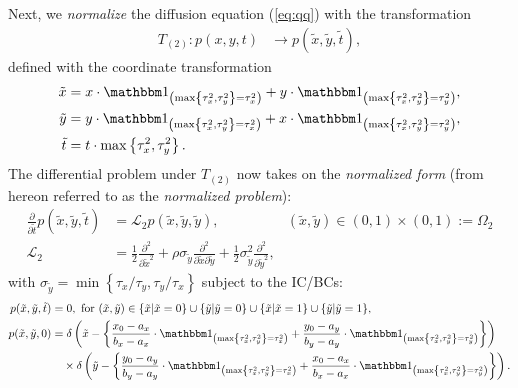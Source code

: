 Next, we \textit{normalize} the diffusion equation (\ref{eq:qq}) with the transformation
\begin{align}
  T_{(2)}: p(x,y,t) &\to p(\tilde{x}, \tilde{y}, \tilde{t}),
\end{align}
defined with the coordinate transformation
\begin{align}
  \tilde{x} &= x\cdot \Indicator{ \max\left\{\tau_x^2, \tau_y^2 \right\} = \tau_x^2} + y\cdot \Indicator{ \max\left\{\tau_x^2, \tau_y^2 \right\} = \tau_y^2}, \\
  \tilde{y} &= y\cdot \Indicator{ \max\left\{\tau_x^2, \tau_y^2 \right\} = \tau_x^2} + x\cdot \Indicator{ \max\left\{\tau_x^2, \tau_y^2 \right\} = \tau_y^2}, \\
  \tilde{t} &= t\cdot \max\left\{\tau_x^2, \tau_y^2 \right\}.
\end{align}
The differential problem under $T_{(2)}$ now takes on the
\textit{normalized form} (from hereon referred to as the
\textit{normalized problem}):
\begin{align}
  \frac{\partial}{\partial \tilde{t}} p(\tilde{x},\tilde{y},\tilde{t}) &= \mathcal{L}_2 p(\tilde{x},\tilde{y},\tilde{y}), & (\tilde{x}, \tilde{y}) \in (0,1) \times (0,1) := \Omega_2 \label{eq:qqq} \\
  \mathcal{L}_2 &= \frac{1}{2} \frac{\partial^2}{\partial \tilde{x}^2} + \rho \sigma_{\tilde{y}} \frac{\partial^2}{\partial \tilde{x} \partial \tilde{y}} + \frac{1}{2} \sigma^2_{\tilde{y}} \frac{\partial^2}{\partial \tilde{y}^2},
\end{align}
with
$\sigma_{\tilde{y}} = \min\left\{ \tau_x/\tau_y, \tau_y/\tau_x
\right\}$ subject to the IC/BCs:
\begin{align}
  p(\tilde{x},\tilde{y},\tilde{t}) &=0,  \mbox{ for }  (\tilde{x},\tilde{y}) \in \{ \tilde{x} | \tilde{x} = 0\} \cup \{ \tilde{y} | \tilde{y} = 0\} \cup \{ \tilde{x} | \tilde{x} = 1\} \cup \{ \tilde{y} | \tilde{y} = 1\}, \nonumber \\
  p(\tilde{x},\tilde{y},0) &= \delta\left( \tilde{x} - \left\{\frac{x_0-a_x}{b_x - a_x}\cdot \Indicator{ \max\left\{\tau_x^2, \tau_y^2 \right\} = \tau_x^2} + \frac{y_0-a_y}{b_y - a_y}\cdot \Indicator{ \max\left\{\tau_x^2, \tau_y^2 \right\} = \tau_y^2} \right\} \right) \\
  &\quad \times \delta\left( \tilde{y} - \left\{\frac{y_0-a_y}{b_y - a_y}\cdot \Indicator{ \max\left\{\tau_x^2, \tau_y^2 \right\} = \tau_x^2} + \frac{x_0-a_x}{b_x - a_x}\cdot \Indicator{ \max\left\{\tau_x^2, \tau_y^2 \right\} = \tau_y^2} \right\} \right). \nonumber
\end{align}

